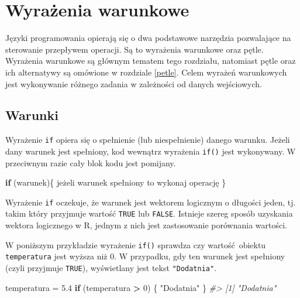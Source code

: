 \documentclass[paper=6in:9in,pagesize=pdftex,headinclude=on,footinclude=on,10pt]{scrbook}
\newenvironment{Shaded}{\begin{snugshade}}{\end{snugshade}}
\newcommand{\CommentTok}[1]{\textcolor[rgb]{0.56,0.35,0.01}{\textit{#1}}}
\newcommand{\ControlFlowTok}[1]{\textcolor[rgb]{0.13,0.29,0.53}{\textbf{#1}}}
\newcommand{\DecValTok}[1]{\textcolor[rgb]{0.00,0.00,0.81}{#1}}
\newcommand{\FloatTok}[1]{\textcolor[rgb]{0.00,0.00,0.81}{#1}}
\newcommand{\NormalTok}[1]{#1}
\newcommand{\OperatorTok}[1]{\textcolor[rgb]{0.81,0.36,0.00}{\textbf{#1}}}
\newcommand{\StringTok}[1]{\textcolor[rgb]{0.31,0.60,0.02}{#1}}
\begin{document}
\hypertarget{warunki}{%
\chapter{Wyrażenia warunkowe}\label{warunki}}

Języki programowania opierają się o dwa podstawowe narzędzia pozwalające na sterowanie przepływem operacji.
Są to wyrażenia warunkowe oraz pętle.
Wyrażenia warunkowe są głównym tematem tego rozdziału, natomiast pętle oraz ich alternatywy są omówione w rozdziale \ref{petle}.
Celem wyrażeń warunkowych jest wykonywanie różnego zadania w zależności od danych wejściowych.

\hypertarget{warunki-1}{%
\section{Warunki}\label{warunki-1}}

Wyrażenie \texttt{if} opiera się o spełnienie (lub niespełnienie) danego warunku.
Jeżeli dany warunek jest spełniony, kod wewnątrz wyrażenia \texttt{if()} jest wykonywany.
W przeciwnym razie cały blok kodu jest pomijany.

\begin{Shaded}
\begin{Highlighting}[]
\ControlFlowTok{if}\NormalTok{ (warunek)\{}
\NormalTok{  jeżeli warunek spełniony to wykonaj operację}
\NormalTok{\}}
\end{Highlighting}
\end{Shaded}

Wyrażenie \texttt{if} oczekuje, że warunek jest wektorem logicznym o długości jeden, tj. takim który przyjmuje wartość \texttt{TRUE} lub \texttt{FALSE}.
Istnieje szereg sposób uzyskania wektora logicznego w R, jednym z nich jest zastosowanie porównania wartości.

W poniższym przykładzie wyrażenie \texttt{if()} sprawdza czy wartość~obiektu \texttt{temperatura} jest wyższa niż 0.
W przypadku, gdy ten warunek jest spełniony (czyli przyjmuje \texttt{TRUE}), wyświetlany jest tekst \texttt{"Dodatnia"}.

\begin{Shaded}
\begin{Highlighting}[]
\NormalTok{temperatura =}\StringTok{ }\FloatTok{5.4}
\ControlFlowTok{if}\NormalTok{ (temperatura }\OperatorTok{>}\StringTok{ }\DecValTok{0}\NormalTok{) \{}
  \StringTok{"Dodatnia"}
\NormalTok{\}}
\CommentTok{#> [1] "Dodatnia"}
\end{Highlighting}
\end{Shaded}
\end{document}
